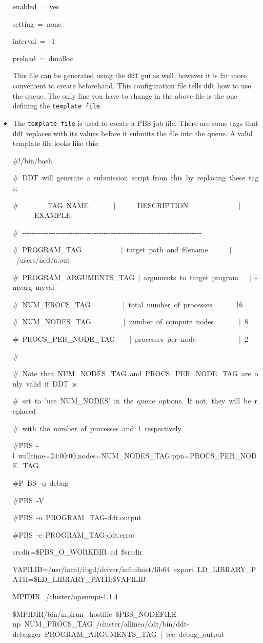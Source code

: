 \begin{itemize}
\begin{lyxcode}
enabled~=~yes~

setting~=~none~

interval~=~-1~

preload~=~dmalloc~
\end{lyxcode}
This file can be generated using the \texttt{ddt} gui as well, however
it is far more convenient to create beforehand. This configuration
file tells \texttt{ddt} how to use the queue. The only line you have
to change in the above file is the one defining the \texttt{template
file}.

\item The \texttt{template file} is used to create a PBS job file. There
are some tags that \texttt{ddt} replaces with its values before it
submits the file into the queue. A valid template file looks like
this:

\begin{lyxcode}
\#!/bin/bash

\#~DDT~will~generate~a~submission~script~from~this~by~replacing~these~tags:~

\#~~~~~~~~TAG~NAME~~~~~~~|~~~~~~DESCRIPTION~~~~~~~~~~~~~~|~~~~~~EXAMPLE~

\#~-{}-{}-{}-{}-{}-{}-{}-{}-{}-{}-{}-{}-{}-{}-{}-{}-{}-{}-{}-{}-{}-{}-{}-{}-{}-{}-{}-{}-{}-{}-{}-{}-{}-{}-{}-{}-{}-{}-{}-{}-{}-{}-{}-{}-{}-{}-{}-{}-{}-{}-{}-{}-{}-{}-{}-{}-{}-{}-{}-{}-{}-{}-{}-{}-{}-{}-{}-{}-{}-{}-{}-{}-{}-{}-~

\#~PROGRAM\_TAG~~~~~~~~~~~|~target~path~and~filename~~~~~~|~/users/ned/a.out~

\#~PROGRAM\_ARGUMENTS\_TAG~|~arguments~to~target~program~~~|~-myarg~myval~

\#~NUM\_PROCS\_TAG~~~~~~~~~|~total~number~of~processes~~~~~|~16~

\#~NUM\_NODES\_TAG~~~~~~~~~|~number~of~compute~nodes~~~~~~~|~8~

\#~PROCS\_PER\_NODE\_TAG~~~~|~processes~per~node~~~~~~~~~~~~|~2~

\#~

\#~Note~that~NUM\_NODES\_TAG~and~PROCS\_PER\_NODE\_TAG~are~only~valid~if~DDT~is~

\#~set~to~'use~NUM\_NODES'~in~the~queue~options.~If~not,~they~will~be~replaced~

\#~with~the~number~of~processes~and~1~respectively.

\#PBS~-l~walltime=24:00:00,nodes=NUM\_NODES\_TAG:ppn=PROCS\_PER\_NODE\_TAG~

\#P~BS~-q~debug~

\#PBS~-V~

\#PBS~-o~PROGRAM\_TAG-ddt.output~

\#PBS~-e~PROGRAM\_TAG-ddt.error



srcdir=\$PBS\_O\_WORKDIR~cd~\$srcdir

VAPILIB=/usr/local/ibgd/driver/infinihost/lib64~export~LD\_LIBRARY\_PATH=\$LD\_LIBRARY\_PATH:\$VAPILIB

MPIDIR=/cluster/openmpi-1.1.4

\$MPIDIR/bin/mpirun~-hostfile~\$PBS\_NODEFILE~-np~NUM\_PROCS\_TAG~/cluster/allinea/ddt/bin/ddt-debugger~PROGRAM\_ARGUMENTS\_TAG~|~tee~debug\_output
\end{lyxcode}
\end{itemize}
